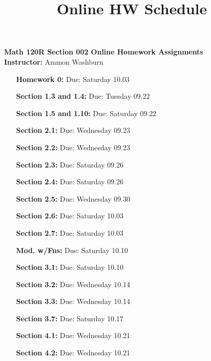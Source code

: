 \documentclass{article}
\title{Online HW Schedule}
\begin{document}
{\centering
{\bf Math 120R Section 002 Online Homework Assignments} \\[10px]
{\bf Instructor: } Ammon Washburn \\[20px]
}

\begin{enumerate}
\item[\bf Homework 0:] {\color{blue} Due: Saturday 10.03}

\item[\bf Section 1.3 and 1.4:] {\color{blue} Due: Tuesday 09.22}

\item[\bf Section 1.5 and 1.10:] {\color{blue} Due: Saturday 09.22}

\item[\bf Section 2.1:] {\color{blue} Due: Wednesday 09.23}

\item[\bf Section 2.2:] {\color{blue} Due: Wednesday 09.23}

\item[\bf Section 2.3:] {\color{blue} Due: Saturday 09.26}

\item[\bf Section 2.4:] {\color{blue} Due: Saturday 09.26}

\item[\bf Section 2.5:] {\color{blue} Due: Wednesday 09.30}

\item[\bf Section 2.6:] {\color{blue} Due: Saturday 10.03}

\item[\bf Section 2.7:] {\color{blue} Due: Saturday 10.03}

\item[\bf Mod. w/Fns:] {\color{blue} Due: Saturday 10.10}

\item[\bf Section 3.1:] {\color{blue} Due: Saturday 10.10}

\item[\bf Section 3.2:] {\color{blue} Due: Wednesday 10.14}

\item[\bf Section 3.3:] {\color{blue} Due: Wednesday 10.14}

\item[\bf Section 3.7:] {\color{blue} Due: Saturday 10.17}

\item[\bf Section 4.1:] {\color{blue} Due: Wednesday 10.21}

\item[\bf Section 4.2:] {\color{blue} Due: Wednesday 10.21}


\end{enumerate}
\end{document}
